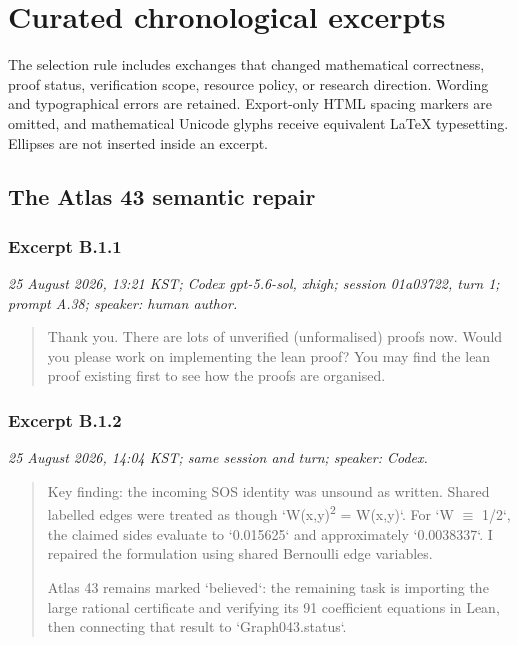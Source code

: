 \section{Curated chronological excerpts}
\label{app:excerpts}
The selection rule includes exchanges that changed mathematical correctness, proof status, verification scope, resource policy, or research direction. Wording and typographical errors are retained.  Export-only HTML spacing markers are omitted, and mathematical Unicode glyphs receive equivalent LaTeX typesetting.  Ellipses are not inserted inside an excerpt.

\subsection{The Atlas 43 semantic repair}
\subsubsection*{Excerpt B.1.1}
\label{ex:B11}
\noindent\textit{25 August 2026, 13:21 KST; Codex gpt-5.6-sol, xhigh; session 01a03722, turn 1; prompt A.38; speaker: human author.}
\begin{quote}\small\ttfamily\raggedright
Thank you. There are lots of unverified (unformalised) proofs now. Would you please work on implementing the lean proof? You may find the lean proof existing first to see how the proofs are organised.
\par
\end{quote}

\subsubsection*{Excerpt B.1.2}
\label{ex:B12}
\noindent\textit{25 August 2026, 14:04 KST; same session and turn; speaker: Codex.}
\begin{quote}\small\ttfamily\raggedright
Key finding: the incoming SOS identity was unsound as written. Shared labelled edges were treated as though `W(x,y)\textsuperscript{2} = W(x,y)`. For `W \(\equiv\) 1/2`, the claimed sides evaluate to `0.015625` and approximately `0.0038337`. I repaired the formulation using shared Bernoulli edge variables.
\par
\medskip
Atlas 43 remains marked `believed`: the remaining task is importing the large rational certificate and verifying its 91 coefficient equations in Lean, then connecting that result to `Graph043.status`.
\par
\end{quote}


